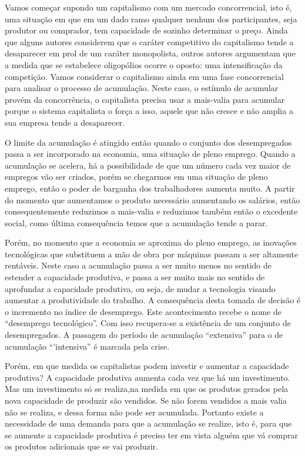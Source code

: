 Vamos começar supondo um capitalismo com um mercado concorrencial, isto é, uma situação em que em um dado ramo qualquer nenhum dos participantes, seja produtor ou comprador,  tem capacidade de sozinho determinar o preço. Ainda que alguns autores considerem que o caráter competitivo do capitalismo tende a desaparecer em prol de um caráter monopolista, outros autores argumentam que a medida que se estabelece oligopólios ocorre o oposto: uma intensificação da competição. Vamos considerar o capitalismo ainda em uma fase concorrencial para analisar o processo de acumulação. Neste caso, o estímulo de acumular provém da concorrência, o capitalista precisa usar a mais-valia para acumular porque o sistema capitalista o força a isso, aquele que não cresce e não amplia a sua empresa tende a desaparecer.

O limite da acumulação é atingido  então quando o conjunto dos desempregados passa a ser incorporado na economia, uma situação de pleno emprego. Quando a acumulação se acelera, há a possibilidade de que um número cada vez maior de empregos vão ser criados, porém se chegarmos em uma situação de pleno emprego, então o poder de barganha dos trabalhadores aumenta muito. A partir do momento que aumentamos o produto necessário aumentando os salários, então consequentemente reduzimos a mais-valia e reduzimos também então o excedente social, como última consequência temos que a acumulação tende a parar.

Porém, no momento que a economia se aproxima do pleno emprego, as inovações tecnológicas que substituem a mão de obra por máquinas passam a ser altamente rentáveis. Neste caso a acumulação passa a ser muito menos no sentido de estender a capacidade produtiva, e passa a ser muito mais no sentido de aprofundar a capacidade produtiva, ou seja, de mudar a tecnologia visando aumentar a produtividade do trabalho. A consequência desta tomada de decisão é o incremento no índice de desemprego. Este acontecimento  recebe o nome de ``desemprego tecnológico''. Com isso recupera-se a existência de um conjunto de desempregados. A passagem do período de acumulação ``extensiva'' para o de acumulação ``'intensiva'' é marcada pela crise.

Porém, em que medida os capitalistas podem investir  e aumentar a capacidade produtiva? A capacidade produtiva aumenta cada vez que há um investimento. Mas um investimento só se realiza,na medida em que os produtos gerados pela nova capacidade de produzir são vendidos. Se não forem vendidos a mais valia não se realiza, e dessa forma não pode ser acumulada. Portanto existe a necessidade de uma demanda para que a acumulação se realize, isto é, para que se aumente a capacidade produtiva é preciso ter em vista alguém que vá comprar os produtos adicionais que se vai produzir.

